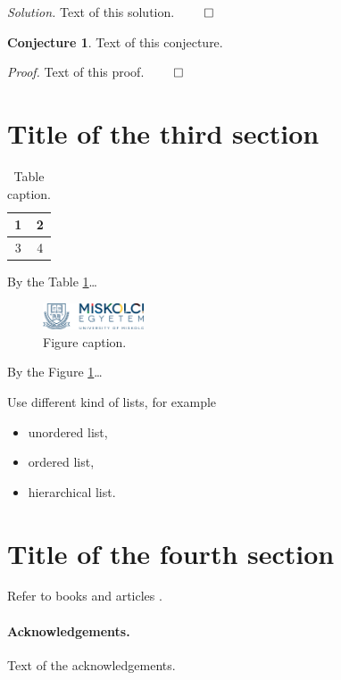 \documentclass[a4paper,12pt]{article}
\theoremstyle{definition}
\newtheorem{conjecture}[theorem]{Conjecture}%
\renewenvironment{proof}[1][]{\noindent\textit{Proof.} }{$\qed$}
\newenvironment{solution}[1][]{\noindent\textit{Solution.} }{$\qed$}
\begin{document}
\begin{solution}
Text of this solution.
\end{solution}

\begin{conjecture}
Text of this conjecture.
\end{conjecture}

\begin{proof}
Text of this proof.
\end{proof}

\section{Title of the third section}

\begin{table}[!ht] %
  \centering
  \caption{Table caption.}\label{table:Key3}
  \medskip
  \begin{tabular}{|c|c|}
    \hline
    1 & 2 \\
    \hline
    3 & 4 \\
    \hline
  \end{tabular}
\end{table}

By the Table \ref{table:Key3}\dots

\begin{figure}[!ht] %
  \centering
  \includegraphics[width=3cm]{ME_Logo.png}
  \caption{Figure caption.}\label{figure:Key4}
\end{figure}

By the Figure \ref{figure:Key4}\dots

Use different kind of lists, for example
\begin{itemize}
\item unordered list,
\item ordered list,
\item hierarchical list.
\end{itemize}

\section{Title of the fourth section}%

Refer to books \cite{erdos2013} and articles \cite{aczel1983}.

\paragraph{Acknowledgements.} Text of the acknowledgements.



\end{document}
